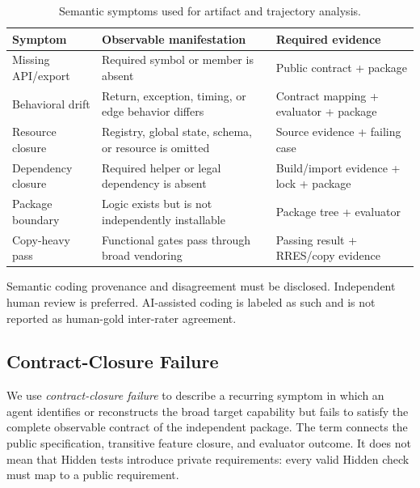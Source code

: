 \documentclass[acmsmall,anonymous,review,screen]{acmart}
\begin{document}
\begin{table}[t]
  \caption{Semantic symptoms used for artifact and trajectory analysis.}
  \label{tab:symptoms}
  \centering
  \begin{tabularx}{\textwidth}{@{}p{}Xp{}@{}}
    \toprule
    \textbf{Symptom} & \textbf{Observable manifestation} & \textbf{Required evidence} \\
    \midrule
    Missing API/export & Required symbol or member is absent
      & Public contract + package \\
    Behavioral drift & Return, exception, timing, or edge behavior differs
      & Contract mapping + evaluator + package \\
    Resource closure & Registry, global state, schema, or resource is omitted
      & Source evidence + failing case \\
    Dependency closure & Required helper or legal dependency is absent
      & Build/import evidence + lock + package \\
    Package boundary & Logic exists but is not independently installable
      & Package tree + evaluator \\
    Copy-heavy pass & Functional gates pass through broad vendoring
      & Passing result + RRES/copy evidence \\
    \bottomrule
  \end{tabularx}
\end{table}

Semantic coding provenance and disagreement must be disclosed. Independent
human review is preferred. AI-assisted coding is labeled as such and is not
reported as human-gold inter-rater agreement.

\subsection{Contract-Closure Failure}

We use \emph{contract-closure failure} to describe a recurring symptom in which
an agent identifies or reconstructs the broad target capability but fails to
satisfy the complete observable contract of the independent package. The term
connects the public specification, transitive feature closure, and evaluator
outcome. It does not mean that Hidden tests introduce private requirements:
every valid Hidden check must map to a public requirement.
\end{document}

